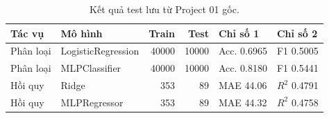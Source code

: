 \par\FloatBarrier\begin{table}[H]\centering\small{}\setlength{\tabcolsep}{5pt}
\caption{Kết quả test lưu từ Project 01 gốc.}\begin{tabular}{llrrll}\toprule
Tác vụ & Mô hình & Train & Test & Chỉ số 1 & Chỉ số 2\\\midrule
Phân loại & LogisticRegression & 40000 & 10000 & Acc. 0.6965 & F1 0.5005\\
Phân loại & MLPClassifier & 40000 & 10000 & Acc. 0.8180 & F1 0.5441\\
Hồi quy & Ridge & 353 & 89 & MAE 44.06 & $R^2$ 0.4791\\
Hồi quy & MLPRegressor & 353 & 89 & MAE 44.32 & $R^2$ 0.4758\\\bottomrule\end{tabular}\end{table}
